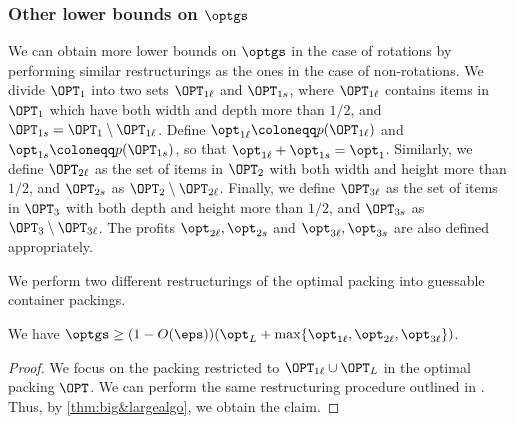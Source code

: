 \subsubsection{Other lower bounds on \texorpdfstring{$\optgs$}{optgs}}
\label{sec:appxratio}
We can obtain more lower bounds on $\optgs$ in the case of rotations by performing similar restructurings as the ones in the case of non-rotations.
We divide $\OPT_1$ into two sets $\OPT_{1\ell}$ and $\OPT_{1s}$, where $\OPT_{1\ell}$ contains items in $\OPT_1$ which have both width and depth more than $1/2$, and $\OPT_{1s}=\OPT_1\setminus \OPT_{1\ell}$.
Define $\opt_{1\ell}\coloneqq p(\OPT_{1\ell})$ and $\opt_{1s}\coloneqq p(\OPT_{1s})$, so that $\opt_{1\ell} + \opt_{1s} = \opt_1$. Similarly, we define $\OPT_{2\ell}$ as the set of items in $\OPT_2$ with both width and height more than $1/2$, and $\OPT_{2s}$ as $\OPT_2\setminus \OPT_{2\ell}$.
Finally, we define $\OPT_{3\ell}$ as the set of items in $\OPT_3$ with both depth and height more than $1/2$, and $\OPT_{3s}$ as $\OPT_3\setminus \OPT_{3\ell}$.
The profits $\opt_{2\ell}, \opt_{2s}$ and $\opt_{3\ell}, \opt_{3s}$ are also defined appropriately.

We perform two different restructurings of the optimal packing into guessable container packings. 

\begin{claim}
    \label{claim:rot-number-theory}
    We have $\optgs\ge (1-O(\eps))(\opt_L+\max\{\opt_{1\ell},\opt_{2\ell},\opt_{3\ell}\})$.
\end{claim}
\begin{proof}
    We focus on the packing restricted to $\OPT_{1\ell}\cup\OPT_L$ in the optimal packing $\OPT$.
    We can perform the same restructuring procedure outlined in . Thus, by \cref{thm:big&largealgo}, we obtain the claim.
\end{proof}

